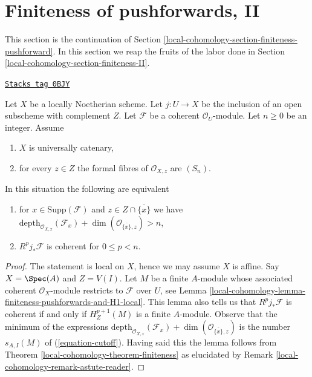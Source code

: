 \section{Finiteness of pushforwards, II}
\label{local-cohomology-section-finiteness-pushforward-II}
This section is the continuation of
Section \ref{local-cohomology-section-finiteness-pushforward}.
In this section we reap the fruits of the labor done in
Section \ref{local-cohomology-section-finiteness-II}.

\begin{lemma}
\label{local-cohomology-lemma-finiteness-Rjstar}
\href{https://stacks.math.columbia.edu/tag/0BJY}{\texttt{Stacks tag 0BJY}}

Let $X$ be a locally Noetherian scheme. Let $j : U \to X$ be the inclusion
of an open subscheme with complement $Z$. Let $\mathcal{F}$ be a coherent
$\mathcal{O}_U$-module. Let $n \geq 0$ be an integer. Assume
\begin{enumerate}
\item $X$ is universally catenary,
\item for every $z \in Z$ the formal fibres of
$\mathcal{O}_{X, z}$ are $(S_n)$.
\end{enumerate}
In this situation the following are equivalent
\begin{enumerate}
\item[(a)] for $x \in \text{Supp}(\mathcal{F})$ and
$z \in Z \cap \overline{\{x\}}$ we have
$\text{depth}_{\mathcal{O}_{X, x}}(\mathcal{F}_x) +
\dim(\mathcal{O}_{\overline{\{x\}}, z}) > n$,
\item[(b)] $R^pj_*\mathcal{F}$ is coherent for $0 \leq p < n$.
\end{enumerate}
\end{lemma}

\begin{proof}
The statement is local on $X$, hence we may assume $X$ is affine.
Say $X = \Spec(A)$ and $Z = V(I)$. Let $M$ be a finite $A$-module
whose associated coherent $\mathcal{O}_X$-module restricts
to $\mathcal{F}$ over $U$, see
Lemma \ref{local-cohomology-lemma-finiteness-pushforwards-and-H1-local}.
This lemma also tells us that $R^pj_*\mathcal{F}$ is coherent
if and only if $H^{p + 1}_Z(M)$ is a finite $A$-module.
Observe that the minimum of the expressions
$\text{depth}_{\mathcal{O}_{X, x}}(\mathcal{F}_x) +
\dim(\mathcal{O}_{\overline{\{x\}}, z})$
is the number $s_{A, I}(M)$ of (\ref{equation-cutoff}).
Having said this the lemma follows from
Theorem \ref{local-cohomology-theorem-finiteness}
as elucidated by Remark \ref{local-cohomology-remark-astute-reader}.
\end{proof}

